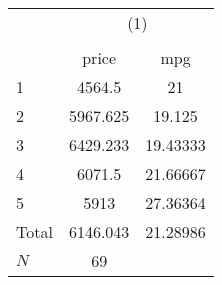 {
\def\sym#1{\ifmmode^{#1}\else\(^{#1}\)\fi}
\begin{tabular}{l*{1}{cc}}
\hline\hline
            &\multicolumn{2}{c}{(1)}  \\
            &\multicolumn{2}{c}{}     \\
            &       price&         mpg\\
\hline
1           &      4564.5&          21\\
2           &    5967.625&      19.125\\
3           &    6429.233&    19.43333\\
4           &      6071.5&    21.66667\\
5           &        5913&    27.36364\\
Total       &    6146.043&    21.28986\\
\hline
\(N\)       &          69&            \\
\hline\hline
\end{tabular}
}
